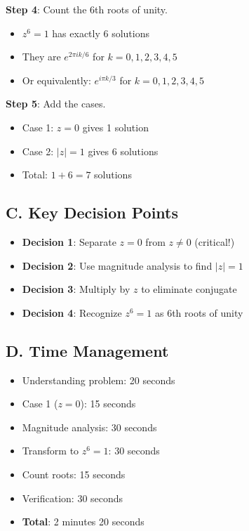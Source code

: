 \documentclass[11pt]{article}
\begin{document}
\begin{roadmapbox}
\textbf{Step 4}: Count the 6th roots of unity.
\begin{itemize}
    \item $z^6 = 1$ has exactly 6 solutions
    \item They are $e^{2\pi i k/6}$ for $k = 0, 1, 2, 3, 4, 5$
    \item Or equivalently: $e^{i\pi k/3}$ for $k = 0, 1, 2, 3, 4, 5$
\end{itemize}

\textbf{Step 5}: Add the cases.
\begin{itemize}
    \item Case 1: $z = 0$ gives 1 solution
    \item Case 2: $|z| = 1$ gives 6 solutions
    \item Total: $1 + 6 = 7$ solutions
\end{itemize}

\subsection*{C. Key Decision Points}
\begin{itemize}[leftmargin=*]
    \item \textbf{Decision 1}: Separate $z = 0$ from $z \neq 0$ (critical!)
    \item \textbf{Decision 2}: Use magnitude analysis to find $|z| = 1$
    \item \textbf{Decision 3}: Multiply by $z$ to eliminate conjugate
    \item \textbf{Decision 4}: Recognize $z^6 = 1$ as 6th roots of unity
\end{itemize}

\subsection*{D. Time Management}
\begin{itemize}[leftmargin=*]
    \item Understanding problem: 20 seconds
    \item Case 1 ($z = 0$): 15 seconds
    \item Magnitude analysis: 30 seconds
    \item Transform to $z^6 = 1$: 30 seconds
    \item Count roots: 15 seconds
    \item Verification: 30 seconds
    \item \textbf{Total}: 2 minutes 20 seconds
\end{itemize}
\end{roadmapbox}
\end{document}
